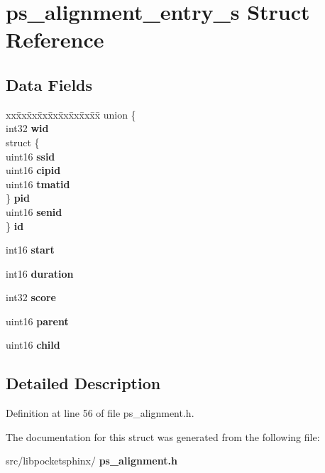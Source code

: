 \section{ps\+\_\+alignment\+\_\+entry\+\_\+s Struct Reference}
\label{structps__alignment__entry__s}
\subsection*{Data Fields}
\begin{DoxyCompactItemize}
\item 
\mbox{\label{structps__alignment__entry__s_a3c41870e66f6813e327a29c1d9b8d3bc}} 
\begin{tabbing}
xx\=xx\=xx\=xx\=xx\=xx\=xx\=xx\=xx\=\kill
union \{\\
\>int32 {\bfseries wid}\\
\>struct \{\\
\>\>uint16 {\bfseries ssid}\\
\>\>uint16 {\bfseries cipid}\\
\>\>uint16 {\bfseries tmatid}\\
\>\} {\bfseries pid}\\
\>uint16 {\bfseries senid}\\
\} {\bfseries id}\\

\end{tabbing}\item 
\mbox{\label{structps__alignment__entry__s_ac3b469463845542c8d29b7c6c4e0f29e}} 
int16 {\bfseries start}
\item 
\mbox{\label{structps__alignment__entry__s_ad5559bb3e102d94e614d6b0357bda3ad}} 
int16 {\bfseries duration}
\item 
\mbox{\label{structps__alignment__entry__s_aa43ae9ba4a890fa70c07606165ea4b87}} 
int32 {\bfseries score}
\item 
\mbox{\label{structps__alignment__entry__s_aef8dfacf69640a3ff88514298aa8f54a}} 
uint16 {\bfseries parent}
\item 
\mbox{\label{structps__alignment__entry__s_a5f8b29052c7257a83af07018dddb7eff}} 
uint16 {\bfseries child}
\end{DoxyCompactItemize}


\subsection{Detailed Description}


Definition at line 56 of file ps\+\_\+alignment.\+h.



The documentation for this struct was generated from the following file\+:\begin{DoxyCompactItemize}
\item 
src/libpocketsphinx/\textbf{ ps\+\_\+alignment.\+h}\end{DoxyCompactItemize}
